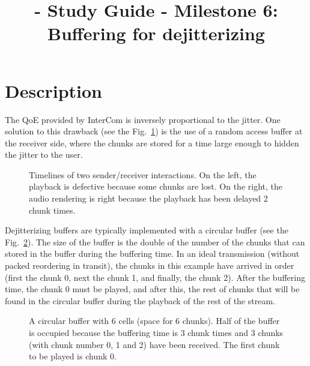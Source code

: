 
\title{\TM - Study Guide - Milestone 6: Buffering for dejitterizing}

\maketitle

\section{Description}

The QoE provided by InterCom is inversely proportional to the
jitter. One solution to this drawback (see the
Fig.~\ref{fig:timelines}) is the use of a random access buffer at the
receiver side, where the chunks are stored for a time large enough to
hidden the jitter to the user.

\begin{figure}
  \begin{center}
  \end{center}
  \caption{Timelines of two sender/receiver interactions. On the left,
    the playback is defective because some chunks are lost. On the
    right, the audio rendering is right because the playback has been
    delayed 2 chunk times.}
  \label{fig:timelines}
\end{figure}

Dejitterizing buffers are typically implemented with a circular buffer
(see the Fig.~\ref{fig:circular_buffer}). The size of the buffer is
the double of the number of the chunks that can stored in the buffer
during the buffering time. In an ideal transmission (without packed
reordering in transit), the chunks in this example have arrived in
order (first the chunk 0, next the chunk 1, and finally, the chunk
2). After the buffering time, the chunk 0 must be played, and after
this, the rest of chunks that will be found in the circular buffer
during the playback of the rest of the stream.

\begin{figure}
  \begin{center}
  \end{center}
  \caption{A circular buffer with 6 cells (space for 6 chunks). Half
    of the buffer is occupied because the buffering time is 3 chunk
    times and 3 chunks (with chunk number 0, 1 and 2) have been
    received. The first chunk to be played is chunk 0.}
  \label{fig:circular_buffer}
\end{figure}

